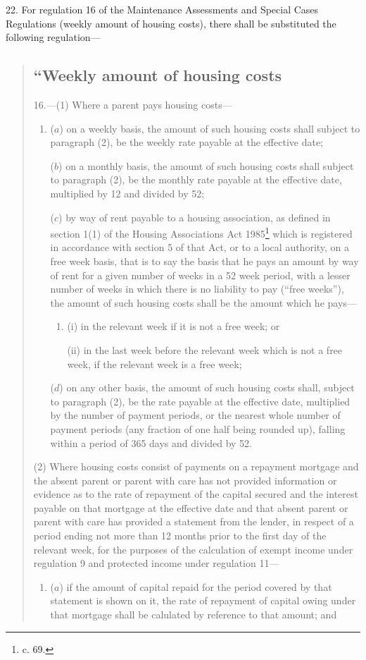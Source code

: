 \documentclass[a4paper]{article}
\begin{document}
22.  For regulation 16 of the Maintenance Assessments and Special Cases Regulations (weekly amount of housing costs), there shall be substituted the following regulation—
\begin{quotation}
\subsection*{“Weekly amount of housing costs}

16.—(1) Where a parent pays housing costs—
\begin{enumerate}\item[]
($a$) on a weekly basis, the amount of such housing costs shall subject to paragraph (2), be the weekly rate payable at the effective date;

($b$) on a monthly basis, the amount of such housing costs shall subject to paragraph (2), be the monthly rate payable at the effective date, multiplied by 12 and divided by 52;

($c$) by way of rent payable to a housing association, as defined in section 1(1) of the Housing Associations Act 1985\footnote{ c. 69.} which is registered in accordance with section 5 of that Act, or to a local authority, on a free week basis, that is to say the basis that he pays an amount by way of rent for a given number of weeks in a 52 week period, with a lesser number of weeks in which there is no liability to pay (“free weeks”), the amount of such housing costs shall be the amount which he pays—
\begin{enumerate}\item[]
(i) in the relevant week if it is not a free week; or

(ii) in the last week before the relevant week which is not a free week, if the relevant week is a free week;
\end{enumerate}

($d$) on any other basis, the amount of such housing costs shall, subject to paragraph (2), be the rate payable at the effective date, multiplied by the number of payment periods, or the nearest whole number of payment periods (any fraction of one half being rounded up), falling within a period of 365 days and divided by 52.
\end{enumerate}

(2) Where housing costs consist of payments on a repayment mortgage and the absent parent or parent with care has not provided information or evidence as to the rate of repayment of the capital secured and the interest payable on that mortgage at the effective date and that absent parent or parent with care has provided a statement from the lender, in respect of a period ending not more than 12 months prior to the first day of the relevant week, for the purposes of the calculation of exempt income under regulation 9 and protected income under regulation 11—
\begin{enumerate}\item[]
($a$) if the amount of capital repaid for the period covered by that statement is shown on it, the rate of repayment of capital owing under that mortgage shall be calulated by reference to that amount; and


\end{enumerate}
\end{quotation}
\end{document}
